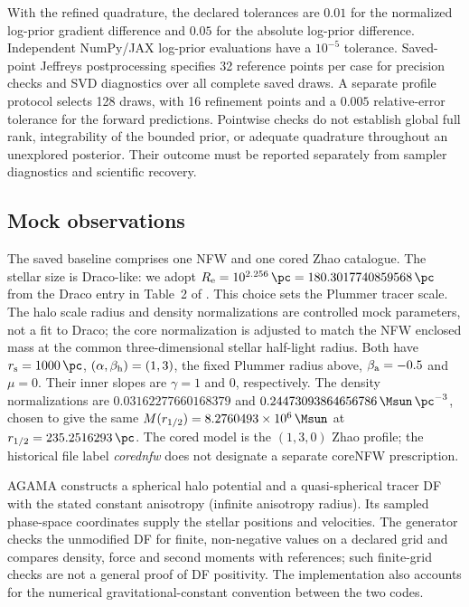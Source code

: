With the refined quadrature, the declared tolerances are $0.01$ for the normalized log-prior gradient difference and $0.05$ for the absolute log-prior difference. Independent NumPy/JAX log-prior evaluations have a $10^{-5}$ tolerance. Saved-point Jeffreys postprocessing specifies 32 reference points per case for precision checks and SVD diagnostics over all complete saved draws. A separate profile protocol selects 128 draws, with 16 refinement points and a $0.005$ relative-error tolerance for the forward predictions. Pointwise checks do not establish global full rank, integrability of the bounded prior, or adequate quadrature throughout an unexplored posterior. Their outcome must be reported separately from sampler diagnostics and scientific recovery.

\subsection{Mock observations}
\label{sec:mocks}
The saved baseline comprises one NFW and one cored Zhao catalogue. The stellar size is Draco-like: we adopt $R_{\rm e}=10^{2.256}\,\pc=180.3017740859568\,\pc$ from the Draco entry in Table~2 of \citet{horigome2022cosmological}. This choice sets the Plummer tracer scale. The halo scale radius and density normalizations are controlled mock parameters, not a fit to Draco; the core normalization is adjusted to match the NFW enclosed mass at the common three-dimensional stellar half-light radius. Both have $r_{\rm s}=1000\,\pc$, $(\alpha,\beta_{\rm h})=(1,3)$, the fixed Plummer radius above, $\beta_{\rm a}=-0.5$ and $\mu=0$. Their inner slopes are $\gamma=1$ and $0$, respectively. The density normalizations are $0.03162277660168379$ and $0.24473093864656786\,\Msun\,\pc^{-3}$, chosen to give the same $M(r_{1/2})=8.2760493\times10^6\,\Msun$ at $r_{1/2}=235.2516293\,\pc$. The cored model is the $(1,3,0)$ Zhao profile; the historical file label \emph{corednfw} does not designate a separate coreNFW prescription.

AGAMA \citep{vasiliev2019} constructs a spherical halo potential and a quasi-spherical tracer DF with the stated constant anisotropy (infinite anisotropy radius). Its sampled phase-space coordinates supply the stellar positions and velocities. The generator checks the unmodified DF for finite, non-negative values on a declared grid and compares density, force and second moments with references; such finite-grid checks are not a general proof of DF positivity. The implementation also accounts for the numerical gravitational-constant convention between the two codes.

